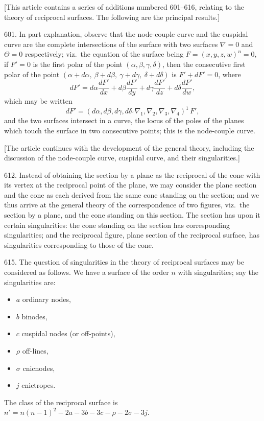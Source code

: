 \documentclass[12pt,a4paper]{article}
\begin{document}
[This article contains a series of additions numbered 601--616, relating to the theory of reciprocal surfaces. The following are the principal results.]

601. In part explanation, observe that the node-couple curve and the cuspidal curve are the complete intersections of the surface with two surfaces $\nabla = 0$ and $\Theta = 0$ respectively; viz.~the equation of the surface being $F = (x, y, z, w)^n = 0$, if $F' = 0$ is the first polar of the point $(\alpha, \beta, \gamma, \delta)$, then the consecutive first polar of the point $(\alpha + d\alpha,\ \beta + d\beta,\ \gamma + d\gamma,\ \delta + d\delta)$ is $F' + dF' = 0$, where
\[
dF' = d\alpha \frac{dF'}{dx} + d\beta \frac{dF'}{dy} + d\gamma \frac{dF'}{dz} + d\delta \frac{dF'}{dw},
\]
which may be written
\[
dF' = (d\alpha, d\beta, d\gamma, d\delta\,\!\!\!{\widetilde{\ }}\nabla_1, \nabla_2, \nabla_3, \nabla_4)^1\, F',
\]
and the two surfaces intersect in a curve, the locus of the poles of the planes which touch the surface in two consecutive points; this is the node-couple curve.

[The article continues with the development of the general theory, including the discussion of the node-couple curve, cuspidal curve, and their singularities.]

612. Instead of obtaining the section by a plane as the reciprocal of the cone with its vertex at the reciprocal point of the plane, we may consider the plane section and the cone as each derived from the same cone standing on the section; and we thus arrive at the general theory of the correspondence of two figures, viz.~the section by a plane, and the cone standing on this section. The section has upon it certain singularities: the cone standing on the section has corresponding singularities; and the reciprocal figure, plane section of the reciprocal surface, has singularities corresponding to those of the cone.

615. The question of singularities in the theory of reciprocal surfaces may be considered as follows. We have a surface of the order $n$ with singularities; say the singularities are:
\begin{itemize}[noitemsep]
\item $a$ ordinary nodes,
\item $b$ binodes,
\item $c$ cuspidal nodes (or off-points),
\item $\rho$ off-lines,
\item $\sigma$ cnicnodes,
\item $j$ cnictropes.
\end{itemize}
The class of the reciprocal surface is $n' = n(n-1)^2 - 2a - 3b - 3c - \rho - 2\sigma - 3j$.
\end{document}
